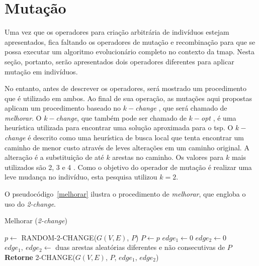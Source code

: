 \section{Mutação}

Uma vez que os operadores para criação arbitrária de indivíduos estejam 
apresentados, fica faltando os operadores de mutação e recombinação para que 
se possa executar um algoritmo evolucionário completo no contexto da \ac{tmap}.
Nesta seção, portanto, serão apresentados dois operadores diferentes para 
aplicar mutação em indivíduos.

No entanto, antes de descrever os operadores, será mostrado um procedimento que 
é utilizado em ambos. Ao final de sua operação, as mutações aqui propostas 
aplicam um procedimento baseado no \textit{$k-$change} 
\citep{Marx:2008:SKN:2283963.2284596}, que será chamado de \textit{melhorar}. 
O \textit{$k-$change}, que também pode ser chamado de \textit{$k-$opt} 
\citep{nilsson2003heuristics}, é uma heurística utilizada para encontrar uma 
solução aproximada para o \ac{tsp}. O \textit{$k-$change} é descrito como uma 
heurística de busca local que tenta encontrar um caminho de menor custo através 
de leves alterações em um caminho original. A alteração é a substituição de até 
$k$ arestas no caminho. Os valores para $k$ mais utilizados são 2, 3 e 4 
\citep{Luke2013Metaheuristics}. Como o objetivo do operador de mutação é 
realizar uma leve mudança no indivíduo, esta pesquisa utilizou $k = 2$.

O pseudocódigo~\ref{melhorar} ilustra o procedimento de \textit{melhorar}, que 
engloba o uso do \textit{2-change}.

\begin{algorithm}                  %
	\caption{Melhorar (\textit{2-change})}          %
	\label{melhorar}                           %
	\begin{algorithmic}[1]                    %
		\newline
		\Repeat
			\State $p \gets $ RANDOM-2-CHANGE($G(V,E)$, $P$)
				\State $P \gets p$
			\EndIf
		\EndProcedure
		\State $edge_{1} \gets 0$
		\State $edge_{2} \gets 0$
		\State $edge_{1},\ edge_{2} \gets $ duas arestas aleatórias diferentes e não consecutivas de $P$
		\State \textbf{Retorne} 2-CHANGE($G(V,E)$, $P$, $edge_{1}$, $edge_{2}$) 
		\EndProcedure
	\end{algorithmic}
\end{algorithm}

